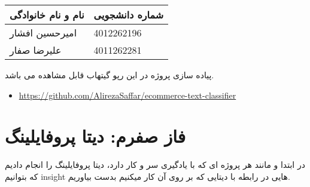 \documentclass[a4paper,12pt]{article}
\begin{document}
	
	\begin{table}[h]
		\centering
		\begin{tabular}{|l|l|}
			\hline
			\textbf{نام و نام خانوادگی} & \textbf{شماره دانشجویی} \\
			\hline
			امیرحسین افشار & 4012262196 \\
			\hline
			علیرضا صفار & 4011262281 \\
			\hline
		\end{tabular}
	\end{table}
	
	
		پیاده سازی پروژه در این رپو گیتهاب قابل مشاهده می باشد.
		\begin{latin}
				\begin{itemize}
						\item \href{https://github.com/AlirezaSaffar/ecommerce-text-classifier}{https://github.com/AlirezaSaffar/ecommerce-text-classifier}
					\end{itemize}
			\end{latin}
		
	
	
	
	
\section{فاز صفرم: دیتا پروفایلینگ}

در ابتدا و مانند هر پروژه ای که با یادگیری سر و کار دارد، دیتا پروفایلینگ را انجام دادیم که بتوانیم insight هایی در رابطه با دیتایی که بر روی آن کار میکنیم بدست بیاوریم.
\end{document}
